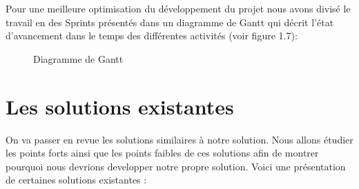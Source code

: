 Pour une meilleure optimisation  du développement du projet nous avons divisé le travail en des Sprints présentés dans un diagramme de Gantt qui décrit l’état d’avancement dans le temps des différentes activités (voir figure 1.7):

\begin{figure}[H]
    \begin{center}
    \end{center}
    \caption{Diagramme de Gantt}
\end{figure}
\section{\selectfont\Large Les solutions existantes}

 On va passer  en revue les solutions similaires à notre solution. Nous allons étudier les points forts ainsi que les points faibles de ces solutions afin de montrer pourquoi nous devrions developper notre propre solution. Voici une présentation de certaines solutions existantes :
